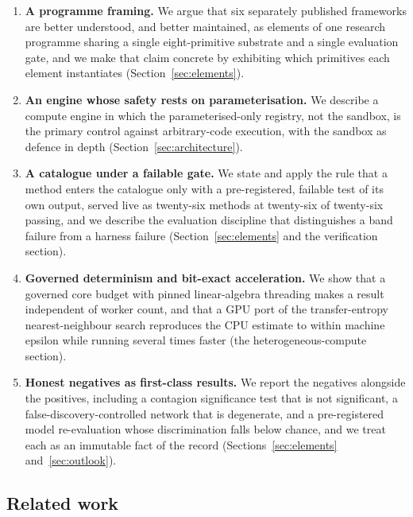 \begin{enumerate}[leftmargin=1.6em]
  \item \textbf{A programme framing.} We argue that six separately published
  frameworks are better understood, and better maintained, as elements of one
  research programme sharing a single eight-primitive substrate and a single
  evaluation gate, and we make that claim concrete by exhibiting which primitives
  each element instantiates (Section~\ref{sec:elements}).

  \item \textbf{An engine whose safety rests on parameterisation.} We describe a
  compute engine in which the parameterised-only registry, not the sandbox, is
  the primary control against arbitrary-code execution, with the sandbox as
  defence in depth (Section~\ref{sec:architecture}).

  \item \textbf{A catalogue under a failable gate.} We state and apply the rule
  that a method enters the catalogue only with a pre-registered, failable test of
  its own output, served live as twenty-six methods at twenty-six of twenty-six
  passing, and we describe the evaluation discipline that distinguishes a band
  failure from a harness failure (Section~\ref{sec:elements} and the
  verification section).

  \item \textbf{Governed determinism and bit-exact acceleration.} We show that a
  governed core budget with pinned linear-algebra threading makes a result
  independent of worker count, and that a GPU port of the transfer-entropy
  nearest-neighbour search reproduces the CPU estimate to within machine epsilon
  while running several times faster (the heterogeneous-compute section).

  \item \textbf{Honest negatives as first-class results.} We report the negatives
  alongside the positives, including a contagion significance test that is not
  significant, a false-discovery-controlled network that is degenerate, and a
  pre-registered model re-evaluation whose discrimination falls below chance, and
  we treat each as an immutable fact of the record (Sections~\ref{sec:elements}
  and~\ref{sec:outlook}).
\end{enumerate}

\subsection{Related work}


